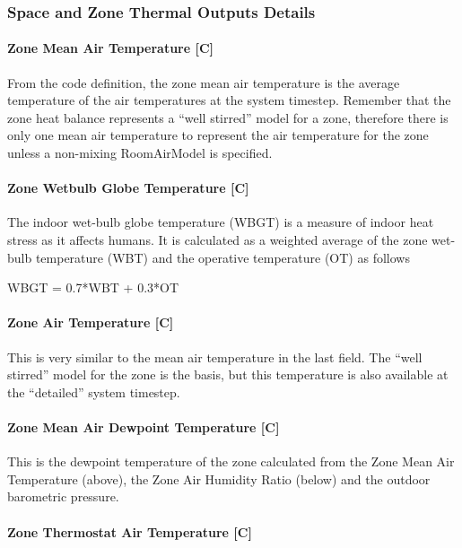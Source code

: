 \subsubsection{Space and Zone Thermal Outputs Details}

\paragraph{Zone Mean Air Temperature {[}C{]}}\label{zone-mean-air-temperature-c}

From the code definition, the zone mean air temperature is the average temperature of the air temperatures at the system timestep. Remember that the zone heat balance represents a ``well stirred'' model for a zone, therefore there is only one mean air temperature to represent the air temperature for the zone unless a non-mixing RoomAirModel is specified.

\paragraph{Zone Wetbulb Globe Temperature {[}C{]}}\label{zone-wetbulb-globe-temperature-c}

The indoor wet-bulb globe temperature (WBGT) is a measure of indoor heat stress as it affects humans.
It is calculated as a weighted average of the zone wet-bulb temperature (WBT) and the operative temperature (OT) as follows

WBGT = 0.7*WBT + 0.3*OT

\paragraph{Zone Air Temperature {[}C{]}}\label{zone-air-temperature-c}

This is very similar to the mean air temperature in the last field. The ``well stirred'' model for the zone is the basis, but this temperature is also available at the ``detailed'' system timestep.

\paragraph{Zone Mean Air Dewpoint Temperature {[}C{]}}\label{zone-mean-air-dewpoint-temperature-c}

This is the dewpoint temperature of the zone calculated from the Zone Mean Air Temperature (above), the Zone Air Humidity Ratio (below) and the outdoor barometric pressure.

\paragraph{Zone Thermostat Air Temperature {[}C{]}}\label{zone-thermostat-air-temperature-c}

